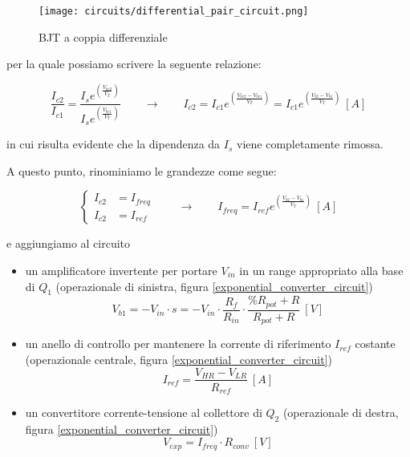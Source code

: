 \begin{figure}[H]
    \centering
    \texttt{[image: circuits/differential\_pair\_circuit.png]}
    \caption{BJT a coppia differenziale}
    \label{differential_pair_circuit}
\end{figure}

per la quale possiamo scrivere la seguente relazione:

\begin{equation}\label{differential_pair}
    \frac{I_{c2}}{I_{c1}}=\frac{I_s e^{\left(\frac{V_{be2}}{V_T}\right)}}{I_s e^{\left(\frac{V_{be1}}{V_T}\right)}}
    \qquad
    \rightarrow
    \qquad
    I_{c2}=I_{c1}e^{\left(\frac{V_{be2}-V_{be1}}{V_T}\right)}=I_{c1}e^{\left(\frac{V_{b2}-V_{b1}}{V_T}\right)}\ [A]
\end{equation}

in cui risulta evidente che la dipendenza da $I_s$ viene completamente rimossa.

A questo punto, rinominiamo le grandezze come segue:

\begin{equation}\label{renamed_differential_pair}
    \left\{ \begin{aligned}
        I_{c2} & = I_{freq} \\
        I_{c2} & = I_{ref}
    \end{aligned} \right.
    \qquad
    \rightarrow
    \qquad
    I_{freq}=I_{ref}e^{\left(\frac{V_{b2}-V_{b1}}{V_T}\right)}\ [A]
\end{equation}

e aggiungiamo al circuito

\begin{itemize}
    \item un amplificatore invertente per portare $V_{in}$ in un range appropriato alla base
          di $Q_1$ (operazionale di sinistra, figura \ref{exponential_converter_circuit})
          \begin{equation}\label{amplifier}
              V_{b1}=-V_{in}\cdot s=
              -V_{in}\cdot\frac{R_f}{R_{in}}\cdot\frac{\%R_{pot}+R}{R_{pot}+R}\ [V]
          \end{equation}
    \item un anello di controllo per mantenere la corrente di riferimento $I_{ref}$ costante
          (operazionale centrale, figura \ref{exponential_converter_circuit})
          \begin{equation}\label{iref}
              I_{ref}=\frac{V_{HR}-V_{LR}}{R_{ref}}\ [A]
          \end{equation}
    \item un convertitore corrente-tensione al collettore di $Q_2$ (operazionale di destra,
          figura \ref{exponential_converter_circuit})
          \begin{equation}\label{ivconv}
              V_{exp}=I_{freq}\cdot R_{conv}\ [V]
          \end{equation}
\end{itemize}

